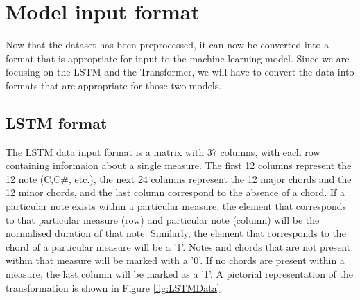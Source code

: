 


\section{Model input format}
Now that the dataset has been preprocessed, it can now be converted into a format that is appropriate for input to the machine learning model. Since we are focusing on the LSTM and the Transformer, we will have to convert the data into formats that are appropriate for those two models.

\subsection{LSTM format}
The LSTM data input format is a matrix with 37 columns, with each row containing informaion about a single measure. The first 12 columns represent the 12 note (C,C\#, etc.), the next 24 columns represent the 12 major chords and the 12 minor chords, and the last column correspond to the absence of a chord. If a particular note exists within a particular measure, the element that corresponds to that particular measure (row) and particular note (column) will be the normalised duration of that note. Similarly, the element that corresponds to the chord of a particular measure will be a '1'. Notes and chords that are not present within that measure will be marked with a '0'. If no chords are present within a measure, the last column will be marked as a '1'. A pictorial representation of the transformation is shown in Figure \ref{fig:LSTMData}.

